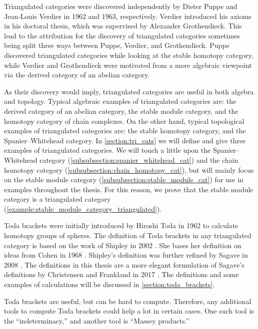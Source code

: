 Triangulated categories were discovered independently by Dieter Puppe and Jean-Louis Verdier in 1962 and 1963, respectively. Verdier introduced his axioms in his doctoral thesis, which was supervised by Alexander Grothendieck. This lead to the attribution for the discovery of triangulated categories sometimes being split three ways between Puppe, Verdier, and Grothendieck. Puppe discovered triangulated categories while looking at the stable homotopy category, while Verdier and Grothendieck were motivated from a more algebraic viewpoint via the derived category of an abelian category.

As their discovery would imply, triangulated categories are useful in both algebra and topology. Typical algebraic examples of triangulated categories are: the derived category of an abelian category, the stable module category, and the homotopy category of chain complexes. On the other hand, typical topological examples of triangulated categories are: the stable homotopy category, and the Spanier--Whitehead category. In \autoref{section:tri_cats} we will define and give three examples of triangulated categories. We will touch a little upon the Spanier--Whitehead category (\autoref{subsubsection:spanier_whitehead_cat}) and the chain homotopy category (\autoref{subsubsection:chain_homotopy_cat}), but will mainly focus on the stable module category (\autoref{subsubsection:stable_module_cat}) for use in examples throughout the thesis. For this reason, we prove that the stable module category is a triangulated category (\autoref{example:stable_module_category_triangulated}).

Toda brackets were initially introduced by Hiroshi Toda in 1962 to calculate homotopy groups of spheres. The definition of Toda brackets in any triangulated category is based on the work of Shipley in 2002 \cite[Definition A.2]{Shipley_2002}. She bases her definition on ideas from Cohen in 1968 \cite[p.\ 308]{Cohen_1968}. Shipley's definition was further refined by Sagave in 2008 \cite[Remark 4.5]{Sagave_2008}. The definitions in this thesis are a more elegant formulation of Sagave's definitions by Christensen and Frankland in 2017 \cite[Definition 3.1]{Christensen-Frankland_2017}. The definitions and some examples of calculations will be discussed in \autoref{section:toda_brackets}.

Toda brackets are useful, but can be hard to compute. Therefore, any additional tools to compute Toda brackets could help a lot in certain cases. One such tool is the ``indeterminacy,'' and another tool is ``Massey products.''

